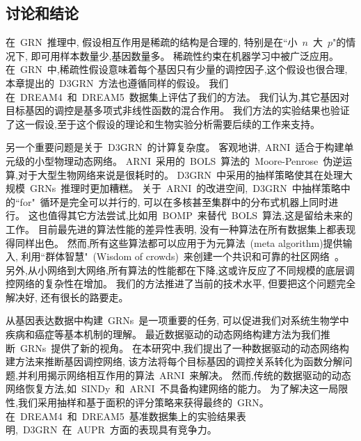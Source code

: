 \subsection{讨论和结论}

在~GRN~推理中, 假设相互作用是稀疏的结构是合理的,
特别是在``小~$n$~大~$p$"的情况下, 即可用样本数量少,基因数量多。
稀疏性约束在机器学习中被广泛应用。
在~GRN~中,稀疏性假设意味着每个基因只有少量的调控因子,这个假设也很合理,
本章提出的~D3GRN~方法也遵循同样的假设。
我们在~DREAM4~和~DREAM5~数据集上评估了我们的方法。
我们认为,其它基因对目标基因的调控是基多项式非线性函数的混合作用。
我们方法的实验结果也验证了这一假设,至于这个假设的理论和生物实验分析需要后续的工作来支持。

另一个重要问题是关于~D3GRN~的计算复杂度。
客观地讲,~ARNI~适合于构建单元级的小型物理动态网络。
ARNI~采用的~BOLS~算法的~Moore-Penrose~伪逆运算,对于大型生物网络来说是很耗时的。
D3GRN~中采用的抽样策略使其在处理大规模~GRNs~推理时更加糟糕。
关于~ARNI~的改进空间,~D3GRN~中抽样策略中的``for"~循环是完全可以并行的,
可以在多核甚至集群中的分布式机器上同时进行。
这也值得其它方法尝试,比如用~BOMP~\cite{majumdar2009fast}来替代~BOLS~算法,这是留给未来的工作。
目前最先进的算法性能的差异性表明,
没有一种算法在所有数据集上都表现得同样出色。
然而,所有这些算法都可以应用于为元算法~(meta algorithm)提供输入,
利用``群体智慧"~(Wisdom of crowds)~来创建一个共识和可靠的社区网络~\cite{Marbach2012a,zheng2008gene}。
另外,从小网络到大网络,所有算法的性能都在下降,这或许反应了不同规模的底层调控网络的复杂性在增加。
我们的方法推进了当前的技术水平, 但要把这个问题完全解决好, 还有很长的路要走。

从基因表达数据中构建~GRNs~是一项重要的任务,
可以促进我们对系统生物学中疾病和癌症等基本机制的理解。
最近数据驱动的动态网络构建方法为我们推断~GRNs~提供了新的视角。
在本研究中,我们提出了一种数据驱动的动态网络构建方法来推断基因调控网络,
该方法将每个目标基因的调控关系转化为函数分解问题,并利用揭示网络相互作用的算法~ARNI~来解决。
然而,传统的数据驱动的动态网络恢复方法,如~SINDy~和~ARNI~不具备构建网络的能力。
为了解决这一局限性,我们采用抽样和基于面积的评分策略来获得最终的~GRN。
在~DREAM4~和~DREAM5~基准数据集上的实验结果表明,~D3GRN~在~AUPR~方面的表现具有竞争力。